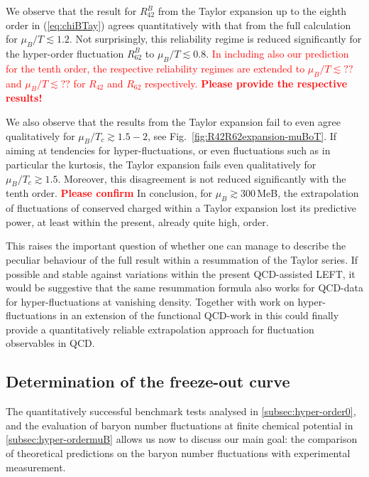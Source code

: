 \documentclass[%
reprint,
superscriptaddress,
showpacs,preprintnumbers,
amsmath,amssymb,
aps,
prd,
]{revtex4-1}
\def\Fig#1{Fig.~\ref{#1}} \def\Tab#1{Tab.~\ref{#1}}
\def\eq#1{(\ref{#1})}
\newcommand{\coljan}[1]{\textcolor{red}{#1}}
\begin{document}
We observe that the result for $R^{B}_{42}$ from the Taylor expansion up to the eighth order in \eq{eq:chiBTay} agrees quantitatively with that from the full calculation for $\mu_B/T\lesssim 1.2$. Not surprisingly, this reliability regime is reduced significantly for the hyper-order fluctuation $R^{B}_{62}$ to $\mu_B/T\lesssim 0.8$. \coljan{In including also our prediction for the tenth order, the respective  reliability regimes are extended to $\mu_B/T\lesssim ??$ and $\mu_B/T\lesssim ??$ for $R_{42}$ and $R_{62}$ respectively. {\bf Please provide the respective results!}} 

We also observe that the results from the Taylor expansion fail to even agree qualitatively for $\mu_B/T_c \gtrsim 1.5-2$, see \Fig{fig:R42R62expansion-muBoT}. If aiming at tendencies for hyper-fluctuations, or even fluctuations such as in particular the kurtosis, the Taylor expansion fails even qualitatively for $\mu_B/T_c \gtrsim 1.5$. 
Moreover, this disagreement is not reduced significantly with the tenth order. \coljan{\bf Please confirm} In conclusion, for $\mu_B\gtrsim 300$\,MeB, the extrapolation of fluctuations of conserved charged within a Taylor expansion lost its predictive power, at least within the present, already quite high, order. 

This raises the important question of whether one can manage to describe the peculiar behaviour of the full result within a resummation of the Taylor series. If possible and stable against variations within the present QCD-assisted LEFT, it would be suggestive that the same  resummation formula also works for QCD-data for hyper-fluctuations at vanishing density. Together with work on hyper-fluctuations in an extension of the functional QCD-work in \cite{Fu:2019hdw} this could finally provide a quantitatively reliable extrapolation approach for fluctuation observables in QCD. 

\subsection{Determination of the  freeze-out curve}
\label{subsec:freezeoutCurve}	

The quantitatively successful benchmark tests analysed in \autoref{subsec:hyper-order0}, and the evaluation of baryon number fluctuations at finite chemical potential 
in \autoref{subsec:hyper-ordermuB} allows us now to discuss our main goal: the comparison of theoretical predictions on the baryon number fluctuations with experimental measurement. 
\end{document}
